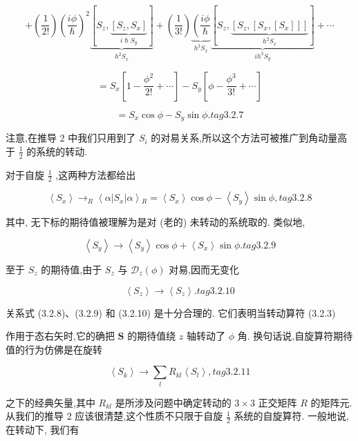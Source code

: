 $$
+ \left( \frac{1}{2!}\right) {\left( \frac{i\phi }{\hslash }\right) }^{2}\underset{{h}^{2}{S}_{x}}{\underbrace{\left\lbrack {S}_{z},\underset{i\hslash {S}_{y}}{\underbrace{\left\lbrack {S}_{z},{S}_{x}\right\rbrack }}\right\rbrack }} + \left( \frac{1}{3!}\right) \underset{{h}^{3}{S}_{x}}{\underbrace{\left( \frac{i\phi }{\hslash }\right. }}\underset{i{h}^{3}{S}_{y}}{\underbrace{\left\lbrack {S}_{z},\underset{{h}^{2}{S}_{x}}{\underbrace{\left\lbrack {S}_{z},\left\lbrack {S}_{x},\left\lbrack {S}_{x}\right\rbrack \right\rbrack \right\rbrack }}\right\rbrack }} + \cdots
$$

$$
= {S}_{x}\left\lbrack {1 - \frac{{\phi }^{2}}{2!} + \cdots }\right\rbrack - {S}_{y}\left\lbrack {\phi - \frac{{\phi }^{3}}{3!} + \cdots }\right\rbrack
$$

$$
= {S}_{x}\cos \phi - {S}_{y}\sin \phi . tag{3.2.7}
$$

注意,在推导 2 中我们只用到了 ${S}_{i}$ 的对易关系,所以这个方法可被推广到角动量高于 $\frac{1}{2}$ 的系统的转动.

对于自旋 $\frac{1}{2}$ ,这两种方法都给出

$$
\left\langle {S}_{x}\right\rangle { \rightarrow }_{R}\left\langle {\alpha \left| {S}_{x}\right| \alpha }\right\rangle {}_{R} = \left\langle {S}_{x}\right\rangle \cos \phi - \left\langle {S}_{y}\right\rangle \sin \phi , tag{3.2.8}
$$

其中, 无下标的期待值被理解为是对 (老的) 未转动的系统取的. 类似地,

$$
\left\langle {S}_{y}\right\rangle \rightarrow \left\langle {S}_{y}\right\rangle \cos \phi + \left\langle {S}_{x}\right\rangle \sin \phi . tag{3.2.9}
$$

至于 ${S}_{z}$ 的期待值,由于 ${S}_{z}$ 与 ${\mathcal{D}}_{z}\left( \phi \right)$ 对易,因而无变化

$$
\left\langle {S}_{z}\right\rangle \rightarrow \left\langle {S}_{z}\right\rangle . tag{3. 2.10}
$$

关系式 (3.2.8)、(3.2.9) 和 (3.2.10) 是十分合理的. 它们表明当转动算符 (3.2.3)

作用于态右矢时,它的确把 $\mathbf{S}$ 的期待值绕 $z$ 轴转动了 $\phi$ 角. 换句话说,自旋算符期待值的行为仿佛是在旋转

$$
\left\langle {S}_{k}\right\rangle \rightarrow \mathop{\sum }\limits_{l}{R}_{kl}\left\langle {S}_{l}\right\rangle , tag{3.2.11}
$$

之下的经典矢量,其中 ${R}_{kl}$ 是所涉及问题中确定转动的 $3 \times 3$ 正交矩阵 $R$ 的矩阵元. 从我们的推导 2 应该很清楚,这个性质不只限于自旋 $\frac{1}{2}$ 系统的自旋算符. 一般地说,在转动下, 我们有

